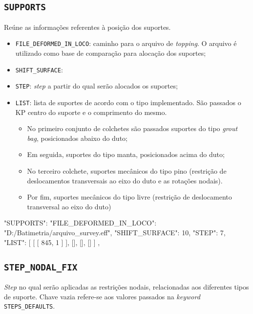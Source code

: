 \subsection{\texttt{SUPPORTS}}

Reúne as informações referentes à posição dos suportes.

\begin{itemize}
  \item \texttt{FILE\_DEFORMED\_IN\_LOCO}: caminho para o arquivo de \textit{topping}. O arquivo é utilizado como base de comparação para alocação dos suportes;
  \item \texttt{SHIFT\_SURFACE}: %
  \item \texttt{STEP}: \textit{step} a partir do qual serão alocados os suportes;
  \item \texttt{LIST}: lista de suportes de acordo com o tipo implementado. São passados o KP centro do suporte e o comprimento do mesmo.
  \begin{itemize}
    \item No primeiro conjunto de colchetes são passados suportes do tipo \textit{grout bag}, posicionados abaixo do duto;
    \item Em seguida, suportes do tipo manta, posicionados acima do duto;
    \item No terceiro colchete, suportes mecânicos do tipo pino (restrição de deslocamentos transversais ao eixo do duto e as rotações nodais).
    \item Por fim, suportes mecânicos do tipo livre (restrição de deslocamento transversal ao eixo do duto)
  \end{itemize}
\end{itemize}

\begin{jsoncode}
{
  "SUPPORTS": {
    "FILE_DEFORMED_IN_LOCO": "D:/Batimetria/arquivo_survey.eff",
    "SHIFT_SURFACE": 10,
    "STEP": 7,
    "LIST": [
      [
        [
          845,
          1
        ]
      ],
      [],
      [],
      []
    ]
  },
}
\end{jsoncode}


\subsection{\texttt{STEP\_NODAL\_FIX}}

\textit{Step} no qual serão aplicadas as restrições nodais, relacionadas aos diferentes tipos de suporte. Chave vazia refere-se aos valores passados na \textit{keyword} \texttt{STEPS\_DEFAULTS}.

